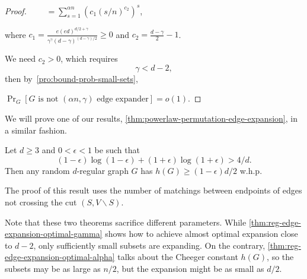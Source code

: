 \begin{proof}
    $\qquad=\sum_{s=1}^{\alpha n}{\left(c_1\left(s/n\right)^{c_2}\right)^s}$,
    
    where $c_1=\frac{e(ed)^{d/2+\gamma}}{\gamma^\gamma(d-\gamma)^{(d-\gamma)/2}}\geq 0$
    and $c_2=\frac{d-\gamma}{2}-1$.
    
    We need $c_2>0$, which requires
    \begin{equation}
        \gamma<d-2,
    \end{equation}
    then by~\autoref{pro:bound-prob-small-sets},
    
    $\Pr_G[G\text{ is not }(\alpha n,\gamma)\text{ edge expander}]=o(1)$.
\end{proof}

We will prove one of our results, \autoref{thm:powerlaw-permutation-edge-expansion}, in a similar fashion.

\begin{theorem}
    \label{thm:reg-edge-expansion-optimal-alpha}
    Let $d\geq3$ and $0<\epsilon<1$ be such that
    \begin{equation}
        \label{eq:bol-eps-req}
        (1-\epsilon)\log{(1-\epsilon)}+(1+\epsilon)\log{(1+\epsilon)}>4/d.
    \end{equation}
    Then any random $d$-regular graph $G$ has $h(G)\geq(1-\epsilon)d/2$ w.h.p.
\end{theorem}

The proof of this result uses the number of matchings
between endpoints of edges not crossing the cut $(S,V\backslash S)$.

Note that these two theorems sacrifice different parameters.
While \autoref{thm:reg-edge-expansion-optimal-gamma} shows how to achieve almost optimal expansion close to $d-2$,
only sufficiently small subsets are expanding.
On the contrary, \autoref{thm:reg-edge-expansion-optimal-alpha} talks about the Cheeger constant $h(G)$,
so the subsets may be as large as $n/2$, but the expansion might be as small as $d/2$.

